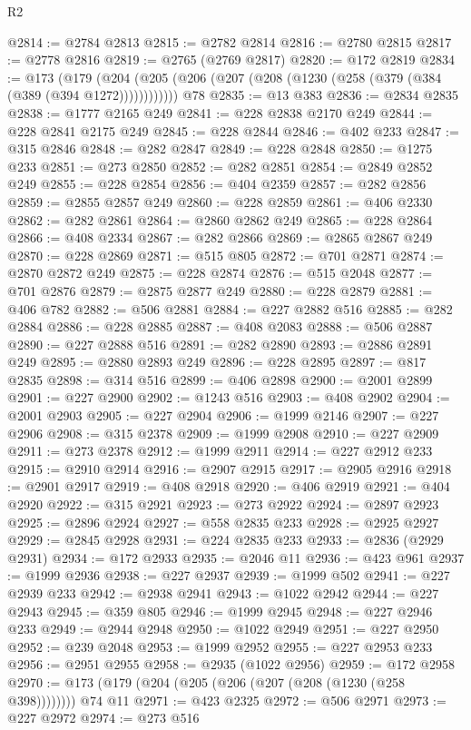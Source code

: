 \begin{lexlean}{R2}
\begin{coremodule}
@2814 := @2784 @2813
@2815 := @2782 @2814
@2816 := @2780 @2815
@2817 := @2778 @2816
@2819 := @2765 (@2769 @2817)
@2820 := @172 @2819
@2834 := @173
    (@179 (@204 (@205 (@206 (@207 (@208 (@1230 (@258 (@379 (@384 (@389 (@394 @1272))))))))))))
    @78
@2835 := @13 @383
@2836 := @2834 @2835
@2838 := @1777 @2165 @249
@2841 := @228 @2838 @2170 @249
@2844 := @228 @2841 @2175 @249
@2845 := @228 @2844
@2846 := @402 @233
@2847 := @315 @2846
@2848 := @282 @2847
@2849 := @228 @2848
@2850 := @1275 @233
@2851 := @273 @2850
@2852 := @282 @2851
@2854 := @2849 @2852 @249
@2855 := @228 @2854
@2856 := @404 @2359
@2857 := @282 @2856
@2859 := @2855 @2857 @249
@2860 := @228 @2859
@2861 := @406 @2330
@2862 := @282 @2861
@2864 := @2860 @2862 @249
@2865 := @228 @2864
@2866 := @408 @2334
@2867 := @282 @2866
@2869 := @2865 @2867 @249
@2870 := @228 @2869
@2871 := @515 @805
@2872 := @701 @2871
@2874 := @2870 @2872 @249
@2875 := @228 @2874
@2876 := @515 @2048
@2877 := @701 @2876
@2879 := @2875 @2877 @249
@2880 := @228 @2879
@2881 := @406 @782
@2882 := @506 @2881
@2884 := @227 @2882 @516
@2885 := @282 @2884
@2886 := @228 @2885
@2887 := @408 @2083
@2888 := @506 @2887
@2890 := @227 @2888 @516
@2891 := @282 @2890
@2893 := @2886 @2891 @249
@2895 := @2880 @2893 @249
@2896 := @228 @2895
@2897 := @817 @2835
@2898 := @314 @516
@2899 := @406 @2898
@2900 := @2001 @2899
@2901 := @227 @2900
@2902 := @1243 @516
@2903 := @408 @2902
@2904 := @2001 @2903
@2905 := @227 @2904
@2906 := @1999 @2146
@2907 := @227 @2906
@2908 := @315 @2378
@2909 := @1999 @2908
@2910 := @227 @2909
@2911 := @273 @2378
@2912 := @1999 @2911
@2914 := @227 @2912 @233
@2915 := @2910 @2914
@2916 := @2907 @2915
@2917 := @2905 @2916
@2918 := @2901 @2917
@2919 := @408 @2918
@2920 := @406 @2919
@2921 := @404 @2920
@2922 := @315 @2921
@2923 := @273 @2922
@2924 := @2897 @2923
@2925 := @2896 @2924
@2927 := @558 @2835 @233
@2928 := @2925 @2927
@2929 := @2845 @2928
@2931 := @224 @2835 @233
@2933 := @2836 (@2929 @2931)
@2934 := @172 @2933
@2935 := @2046 @11
@2936 := @423 @961
@2937 := @1999 @2936
@2938 := @227 @2937
@2939 := @1999 @502
@2941 := @227 @2939 @233
@2942 := @2938 @2941
@2943 := @1022 @2942
@2944 := @227 @2943
@2945 := @359 @805
@2946 := @1999 @2945
@2948 := @227 @2946 @233
@2949 := @2944 @2948
@2950 := @1022 @2949
@2951 := @227 @2950
@2952 := @239 @2048
@2953 := @1999 @2952
@2955 := @227 @2953 @233
@2956 := @2951 @2955
@2958 := @2935 (@1022 @2956)
@2959 := @172 @2958
@2970 := @173 (@179 (@204 (@205 (@206 (@207 (@208 (@1230 (@258 @398)))))))) @74 @11
@2971 := @423 @2325
@2972 := @506 @2971
@2973 := @227 @2972
@2974 := @273 @516

\end{coremodule}
\end{lexlean}
